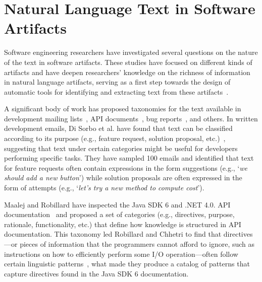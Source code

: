 \section{Natural Language Text in Software Artifacts}
\label{cp2:text-in-se}





Software engineering researchers
have investigated several questions on the nature of the text in software artifacts.
These studies 
have focused on different kinds of artifacts and have deepen
 researchers' knowledge on the richness of information in natural language artifacts,
 serving as a first step towards the design of automatic tools 
for identifying and extracting text from these artifacts~\cite{Arya2019, Maalej2013}.




A significant body of work has 
 proposed taxonomies for the text available 
 in development mailing lists~\cite{Sorbo2015, huang2018automating},
API documents~\cite{Maalej2013}, bug reports~\cite{Arya2019}, and others.
In written development emails, Di Sorbo et al. have found that 
text can be classified according to its purpose (e.g., feature request, solution proposal, etc.)~\cite{Sorbo2015},
suggesting that text under certain categories might be useful for developers performing specific tasks. 
They have sampled 100 emails and identified that text for feature requests 
often contain expressions in the form suggestions
(e.g., `\textit{we should add a new button}') while solution proposals 
are often expressed in the form of attempts (e.g., `\textit{let's try a new method to compute cost}').



Maalej and Robillard have inspected the Java SDK 6 and .NET 4.0. API documentation~\cite{Maalej2013}
and proposed a set of categories (e.g., directives, purpose, rationale, functionality, etc.) that define how 
knowledge is structured in API documentation. 
This taxonomy led Robillard and Chhetri 
to find that directives---or pieces of information that the programmers
cannot afford to ignore, such as instructions on how to efficiently
perform some I/O operation---often 
follow certain linguistic patterns~\cite{Robillard2015},
what made they produce a catalog of patterns that capture directives found in the 
Java SDK 6 documentation.



